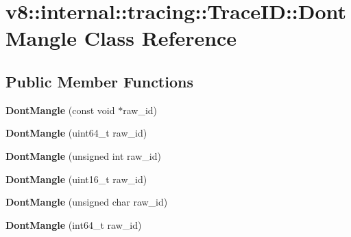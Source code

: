 \hypertarget{classv8_1_1internal_1_1tracing_1_1_trace_i_d_1_1_dont_mangle}{}\section{v8\+:\+:internal\+:\+:tracing\+:\+:Trace\+ID\+:\+:Dont\+Mangle Class Reference}
\label{classv8_1_1internal_1_1tracing_1_1_trace_i_d_1_1_dont_mangle}
\subsection*{Public Member Functions}
\begin{DoxyCompactItemize}
\item 
{\bfseries Dont\+Mangle} (const void $\ast$raw\+\_\+id)\hypertarget{classv8_1_1internal_1_1tracing_1_1_trace_i_d_1_1_dont_mangle_a9a72930e7a8bdccec05a64aaf7ca171a}{}\label{classv8_1_1internal_1_1tracing_1_1_trace_i_d_1_1_dont_mangle_a9a72930e7a8bdccec05a64aaf7ca171a}

\item 
{\bfseries Dont\+Mangle} (uint64\+\_\+t raw\+\_\+id)\hypertarget{classv8_1_1internal_1_1tracing_1_1_trace_i_d_1_1_dont_mangle_a640a9983c376d13087feda4742eddb14}{}\label{classv8_1_1internal_1_1tracing_1_1_trace_i_d_1_1_dont_mangle_a640a9983c376d13087feda4742eddb14}

\item 
{\bfseries Dont\+Mangle} (unsigned int raw\+\_\+id)\hypertarget{classv8_1_1internal_1_1tracing_1_1_trace_i_d_1_1_dont_mangle_a5898fec399901817757a0c8895b0e699}{}\label{classv8_1_1internal_1_1tracing_1_1_trace_i_d_1_1_dont_mangle_a5898fec399901817757a0c8895b0e699}

\item 
{\bfseries Dont\+Mangle} (uint16\+\_\+t raw\+\_\+id)\hypertarget{classv8_1_1internal_1_1tracing_1_1_trace_i_d_1_1_dont_mangle_aec4092f89544a255adcba0a4dc6130e0}{}\label{classv8_1_1internal_1_1tracing_1_1_trace_i_d_1_1_dont_mangle_aec4092f89544a255adcba0a4dc6130e0}

\item 
{\bfseries Dont\+Mangle} (unsigned char raw\+\_\+id)\hypertarget{classv8_1_1internal_1_1tracing_1_1_trace_i_d_1_1_dont_mangle_acf84b4c1d8614000b4168680992f734a}{}\label{classv8_1_1internal_1_1tracing_1_1_trace_i_d_1_1_dont_mangle_acf84b4c1d8614000b4168680992f734a}

\item 
{\bfseries Dont\+Mangle} (int64\+\_\+t raw\+\_\+id)\hypertarget{classv8_1_1internal_1_1tracing_1_1_trace_i_d_1_1_dont_mangle_a8abe36b0255ea3f3e3aef4701520af5b}{}\label{classv8_1_1internal_1_1tracing_1_1_trace_i_d_1_1_dont_mangle_a8abe36b0255ea3f3e3aef4701520af5b}


\end{DoxyCompactItemize}
